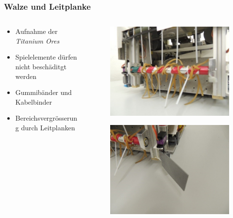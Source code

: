 \begin{frame}
	\frametitle{Walze und Leitplanke}
	\begin{columns}
		\begin{column}{0.6 \textwidth}
			\begin{itemize}
				\item Aufnahme der \textit{Titanium Ores}
				\item Spielelemente dürfen nicht beschäditgt werden
				\item Gummibänder und Kabelbinder
				\item Bereichsvergrösserung durch Leitplanken
			\end{itemize}
		\end{column}
		\begin{column}{0.4 \textwidth}
			\vspace{-2.5em}
			\begin{figure}[h]
				\centering
				\includegraphics[width = 0.9 \textwidth]{../images/presentation/walze.jpg}
			\end{figure}
			\vspace{-2.2em}
			\begin{figure}[h]
				\centering
				\includegraphics[width = 0.9 \textwidth]{../images/presentation/leitplanke.jpg}
			\end{figure}
		\end{column}
	\end{columns}
\end{frame}

